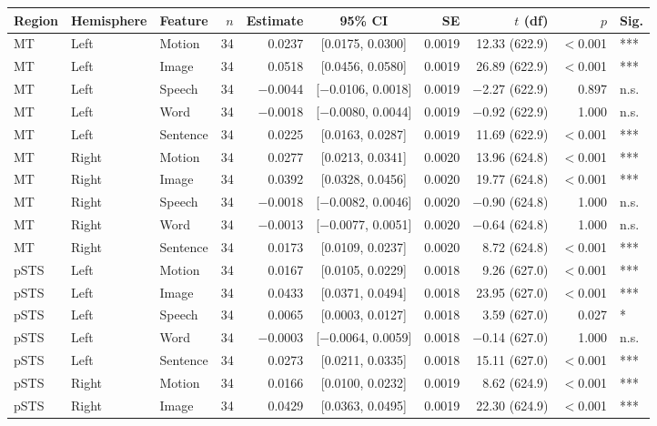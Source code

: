 \begin{table}[h]
\centering
\begin{tabular}{lllrrcrrrl}
\toprule
Region & Hemisphere & Feature & $n$ & Estimate & 95\% CI & SE & $t$ (df) & $p$ & Sig. \\
\midrule
MT & Left & Motion & 34 & 0.0237 & [0.0175, 0.0300] & 0.0019 & 12.33 (622.9) & $<$0.001 & *** \\
MT & Left & Image & 34 & 0.0518 & [0.0456, 0.0580] & 0.0019 & 26.89 (622.9) & $<$0.001 & *** \\
MT & Left & Speech & 34 & $-$0.0044 & [$-$0.0106, 0.0018] & 0.0019 & $-$2.27 (622.9) & 0.897 & n.s. \\
MT & Left & Word & 34 & $-$0.0018 & [$-$0.0080, 0.0044] & 0.0019 & $-$0.92 (622.9) & 1.000 & n.s. \\
MT & Left & Sentence & 34 & 0.0225 & [0.0163, 0.0287] & 0.0019 & 11.69 (622.9) & $<$0.001 & *** \\
MT & Right & Motion & 34 & 0.0277 & [0.0213, 0.0341] & 0.0020 & 13.96 (624.8) & $<$0.001 & *** \\
MT & Right & Image & 34 & 0.0392 & [0.0328, 0.0456] & 0.0020 & 19.77 (624.8) & $<$0.001 & *** \\
MT & Right & Speech & 34 & $-$0.0018 & [$-$0.0082, 0.0046] & 0.0020 & $-$0.90 (624.8) & 1.000 & n.s. \\
MT & Right & Word & 34 & $-$0.0013 & [$-$0.0077, 0.0051] & 0.0020 & $-$0.64 (624.8) & 1.000 & n.s. \\
MT & Right & Sentence & 34 & 0.0173 & [0.0109, 0.0237] & 0.0020 & 8.72 (624.8) & $<$0.001 & *** \\
pSTS & Left & Motion & 34 & 0.0167 & [0.0105, 0.0229] & 0.0018 & 9.26 (627.0) & $<$0.001 & *** \\
pSTS & Left & Image & 34 & 0.0433 & [0.0371, 0.0494] & 0.0018 & 23.95 (627.0) & $<$0.001 & *** \\
pSTS & Left & Speech & 34 & 0.0065 & [0.0003, 0.0127] & 0.0018 & 3.59 (627.0) & 0.027 & * \\
pSTS & Left & Word & 34 & $-$0.0003 & [$-$0.0064, 0.0059] & 0.0018 & $-$0.14 (627.0) & 1.000 & n.s. \\
pSTS & Left & Sentence & 34 & 0.0273 & [0.0211, 0.0335] & 0.0018 & 15.11 (627.0) & $<$0.001 & *** \\
pSTS & Right & Motion & 34 & 0.0166 & [0.0100, 0.0232] & 0.0019 & 8.62 (624.9) & $<$0.001 & *** \\
pSTS & Right & Image & 34 & 0.0429 & [0.0363, 0.0495] & 0.0019 & 22.30 (624.9) & $<$0.001 & *** \\

\end{tabular}
\end{table}

